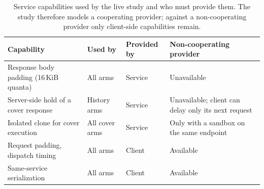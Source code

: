\begin{table}[t]\centering\footnotesize
\caption{Service capabilities used by the live study and who must provide them. The study therefore models a cooperating provider; against a non-cooperating provider only client-side capabilities remain.}\label{tab:service-contract}
\setlength{\tabcolsep}{3pt}
\begin{tabularx}{\columnwidth}{@{}P{.3\columnwidth}P{.2\columnwidth}P{.14\columnwidth}Y@{}}\toprule
Capability & Used by & Provided by & Non-cooperating provider \\\midrule
Response body padding (16\,KiB quanta) & All arms & Service & Unavailable \\\addlinespace[2pt]
Server-side hold of a cover response & History arms & Service & Unavailable; client can delay only its next request \\\addlinespace[2pt]
Isolated clone for cover execution & All cover arms & Service & Only with a sandbox on the same endpoint \\\addlinespace[2pt]
Request padding, dispatch timing & All arms & Client & Available \\\addlinespace[2pt]
Same-service serialization & All arms & Client & Available \\\bottomrule
\end{tabularx}\end{table}
